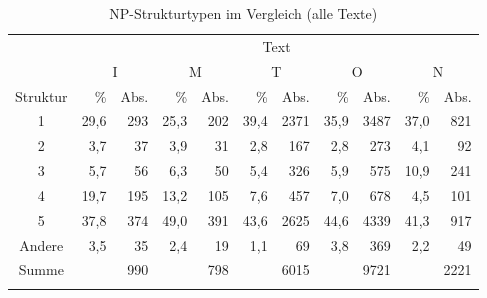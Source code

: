 \begin{table}
\centering
\begin{tabular}{crrrrrrrrrr}
\lsptoprule
& \multicolumn{10}{c}{Text}\\\cmidrule(lr){2-11}
& \multicolumn{2}{c}{{I}}      & \multicolumn{2}{c}{{M}} & \multicolumn{2}{c}{{T}}      & \multicolumn{2}{c}{{O}}      & \multicolumn{2}{c}{{N}}     \\\cmidrule(lr){2-3}\cmidrule(lr){4-5}\cmidrule(lr){6-7}\cmidrule(lr){8-9}\cmidrule(lr){10-11}
                                   {Struktur}     &\%    & Abs.&\%   & Abs.&\%   & Abs. &\%   & Abs. &\%   & Abs.\\\midrule
1      & 29,6  & 293 & 25,3 & 202 & 39,4 & 2371 & 35,9 & 3487 & 37,0 & 821 \\
2   & 3,7   & 37  & 3,9  & 31  & 2,8  & 167  & 2,8  & 273  & 4,1  & 92  \\
3                                 & 5,7   & 56  & 6,3  & 50  & 5,4  & 326  & 5,9  & 575  & 10,9 & 241 \\
4                                  & 19,7  & 195 & 13,2 & 105 & 7,6  & 457  & 7,0  & 678  & 4,5  & 101 \\
5                           & 37,8  & 374 & 49,0 & 391 & 43,6 & 2625 & 44,6 & 4339 & 41,3 & 917 \\
Andere                                 & 3,5   & 35  & 2,4  & 19  & 1,1  & 69   & 3,8  & 369  & 2,2  & 49  \\\midrule
Summe                                  &       & 990 &      & 798 &      & 6015 &      & 9721 &      & 2221\\ \lspbottomrule
\end{tabular}
\caption{NP-Strukturtypen im Vergleich (alle Texte)}
\label{tab:strukturtypen-vergleich}
\end{table}



